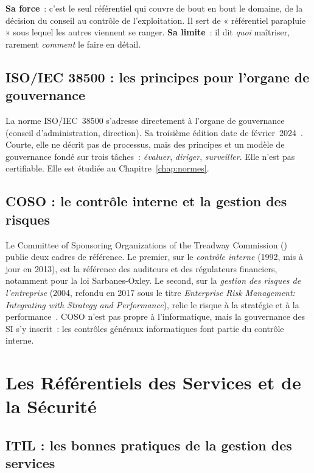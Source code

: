 \textbf{Sa force}~: c'est le seul référentiel qui couvre de bout en bout
le domaine, de la décision du conseil au contrôle de l'exploitation. Il
sert de « référentiel parapluie » sous lequel les autres viennent se
ranger. \textbf{Sa limite}~: il dit \emph{quoi} maîtriser, rarement
\emph{comment} le faire en détail.

\subsection{ISO/IEC 38500 : les principes pour l'organe de gouvernance}

La norme ISO/IEC~38500 s'adresse directement à l'organe de gouvernance
(conseil d'administration, direction). Sa troisième édition date de
février~2024~\cite{iso38500_2024}. Courte, elle ne décrit pas de
processus, mais des principes et un modèle de gouvernance fondé sur trois
tâches~: \emph{évaluer}, \emph{diriger}, \emph{surveiller}. Elle n'est
pas certifiable. Elle est étudiée au Chapitre~\ref{chap:normes}.

\subsection{COSO : le contrôle interne et la gestion des risques}

Le Committee of Sponsoring Organizations of the Treadway Commission
() publie deux cadres de référence. Le premier, sur le
\emph{contrôle interne} (1992, mis à jour en 2013), est la référence des
auditeurs et des régulateurs financiers, notamment pour la loi
Sarbanes-Oxley. Le second, sur la \emph{gestion des risques de
l'entreprise} (2004, refondu en 2017 sous le titre \emph{Enterprise Risk
Management: Integrating with Strategy and Performance}), relie le risque à
la stratégie et à la performance~\cite{coso2017erm}. COSO n'est pas
propre à l'informatique, mais la gouvernance des SI s'y inscrit~: les
contrôles généraux informatiques font partie du contrôle interne.

\section{Les Référentiels des Services et de la Sécurité}
\label{sec:c04-services}

\subsection{ITIL : les bonnes pratiques de la gestion des services}

